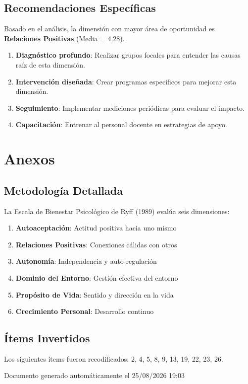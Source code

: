 \documentclass[12pt,a4paper]{article}
\begin{document}
\subsection{Recomendaciones Específicas}

Basado en el análisis, la dimensión con mayor área de oportunidad es 
\textbf{Relaciones Positivas} (Media = 4.28).

\begin{enumerate}
    \item \textbf{Diagnóstico profundo}: Realizar grupos focales para entender las 
    causas raíz de esta dimensión.
    \item \textbf{Intervención diseñada}: Crear programas específicos para mejorar 
    esta dimensión.
    \item \textbf{Seguimiento}: Implementar mediciones periódicas para evaluar el impacto.
    \item \textbf{Capacitación}: Entrenar al personal docente en estrategias de apoyo.
\end{enumerate}

\newpage
\appendix
\section{Anexos}

\subsection{Metodología Detallada}
La Escala de Bienestar Psicológico de Ryff (1989) evalúa seis dimensiones:
\begin{enumerate}
    \item \textbf{Autoaceptación}: Actitud positiva hacia uno mismo
    \item \textbf{Relaciones Positivas}: Conexiones cálidas con otros
    \item \textbf{Autonomía}: Independencia y auto-regulación
    \item \textbf{Dominio del Entorno}: Gestión efectiva del entorno
    \item \textbf{Propósito de Vida}: Sentido y dirección en la vida
    \item \textbf{Crecimiento Personal}: Desarrollo continuo
\end{enumerate}

\subsection{Ítems Invertidos}
Los siguientes ítems fueron recodificados: 2, 4, 5, 8, 9, 13, 19, 22, 23, 26.

\vfill

\begin{center}
\textcolor{ustgray}{\small Documento generado automáticamente el 25/08/2026 19:03}
\end{center}
\end{document}
